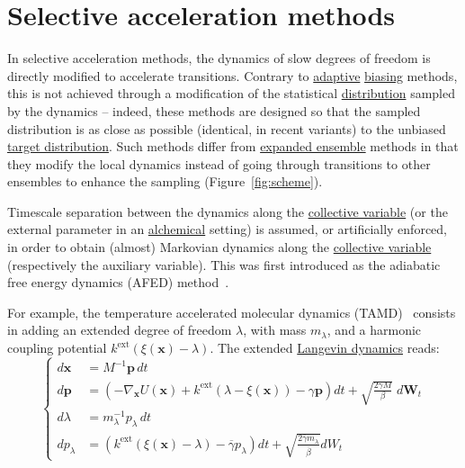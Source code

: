\documentclass[9pt,review]{livecoms}
\newcommand{\vx}{\mathbf{x}}
\newcommand{\vp}{\mathbf{p}}
\begin{document}
\section{Selective acceleration methods}
\label{sec:selective_accel}


In selective acceleration methods, the dynamics of slow degrees of freedom is directly modified to accelerate transitions.
Contrary to \hyperlink{ref:Adaptive} {adaptive} \hyperlink{ref:biasingE} {biasing} methods, this is not achieved through a modification of the statistical \hyperlink{ref:Distribution} {distribution} sampled by the dynamics -- indeed, these methods are designed so that the sampled distribution is as close as possible (identical, in recent variants) to the unbiased \hyperlink{ref:targetdist} {target distribution}.
Such methods differ from \hyperlink{ref:ExpEns} {expanded ensemble} methods in that they modify the local dynamics instead of going through transitions to other ensembles to enhance the sampling (Figure~\ref{fig:scheme}).

Timescale separation between the dynamics along the \hyperlink{ref:CV} {collective variable} (or the external parameter in an \hyperlink{ref:Alchemical} {alchemical} setting) is assumed, or artificially enforced, in order to obtain (almost) Markovian dynamics along the \hyperlink{ref:CV} {collective variable} (respectively the auxiliary variable).
This was first introduced as the adiabatic free energy dynamics (AFED) method~\cite{doi:10.1063/1.1448491}.

For example, the temperature accelerated molecular dynamics (TAMD)~\cite{MV06} consists in adding an extended degree of freedom $\lambda$, with mass $m_\lambda$, and a harmonic coupling potential $k^\mathrm{ext} \left( \xi(\vx) - \lambda \right)$.
The extended \hyperlink{ref:Langevin} {Langevin dynamics} reads:
\begin{equation}
\left\{
\begin{array}{ll}
    d\vx &= M^{-1} \vp \,  dt \\
    d\vp &= \left(-\nabla_\vx U(\vx) + k^\mathrm{ext} ( \lambda -\xi(\vx)) - \gamma \vp \right) dt
    + \sqrt{ \frac{2 \gamma M}{\beta}} \; d\mathbf{W}_t \\
    d\lambda &= m_\lambda^{-1} p_\lambda \, dt\\
    d p_\lambda &= \left( k^\mathrm{ext} (\xi(\vx) - \lambda)  - \overline\gamma p_\lambda \right) dt
    + \sqrt{ \frac{2 \bar\gamma m_\lambda}{ \overline\beta}} dW_t
\end{array}
\right.
\end{equation}
\end{document}
